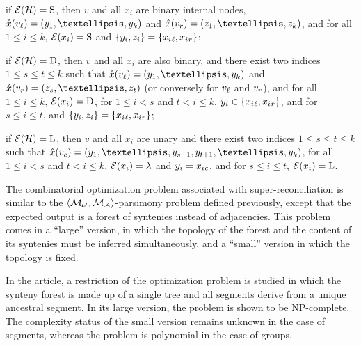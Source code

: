 \begin{compactitemize}
    \item if \(\mathcal{E}(\mathcal{H}) = \mathrm{S}\), then
        \(v\) and all \(x_i\) are binary internal nodes,
        \(\exseg(v\lchild) = (y_1, …, y_k)\) and \(\exseg(v\rchild) = (z_1, …, z_k)\),
        and for all \(1 \leq i \leq k\),
        \(\mathcal{E}(x_i) = \mathrm{S}\)
        and \(\{y_i, z_i\} = \{x_i{}_\mathit{\ell}, x_i{}_r\}\);
    \item if \(\mathcal{E}(\mathcal{H}) = \mathrm{D}\), then
        \(v\) and all \(x_i\) are also binary,
        and there exist two indices \(1 \leq s \leq t \leq k\) such that
        \(\exseg(v\lchild) = (y_1, …, y_k)\) and \(\exseg(v\rchild) = (z_s, …, z_t)\)
        (or conversely for \(v_\mathit{\ell}\) and \(v_r\)),
        and for all \(1 \leq i \leq k\),
        \(\mathcal{E}(x_i) = \mathrm{D}\),
        for \(1 \leq i < s\) and \(t < i \leq k\),
        \(y_i \in \{x_i{}_\mathit{\ell}, x_i{}_r\}\),
        and for \(s \leq i \leq t\),
        and \(\{y_i, z_i\} = \{x_i{}_\mathit{\ell}, x_i{}_r\}\);
    \item if \(\mathcal{E}(\mathcal{H}) = \mathrm{L}\), then
        \(v\) and all \(x_i\) are unary and
        there exist two indices \(1 \leq s \leq t \leq k\) such that
        \(\exseg(v\child) = (y_1, …, y_{s-1}, y_{t+1}, …, y_k)\),
        for all \(1 \leq i < s\) and \(t < i \leq k\),
        \(\mathcal{E}(x_i) = \lambda\) and
        \(y_i = x_i{}_c\),
        and for \(s \leq i \leq t\),
        \(\mathcal{E}(x_i) = \mathrm{L}\).
\end{compactitemize}

The combinatorial optimization problem associated with super-reconciliation is similar to the \(\left\langle\mathcal{M}\mathcal{_U}, \mathcal{M}\mathcal{_A}\right\rangle\)-parsimony problem defined previously, except that the expected output is a forest of syntenies instead of adjacencies.
This problem comes in a \enquote{large} version, in which the topology of the forest and the content of its syntenies must be inferred simultaneously, and a \enquote{small} version in which the topology is fixed.

In the article, a restriction of the optimization problem is studied in which the synteny forest is made up of a single tree and all segments derive from a unique ancestral segment.
In its large version, the problem is shown to be NP-complete.
The complexity status of the small version remains unknown in the case of segments, whereas the problem is polynomial in the case of groups.
